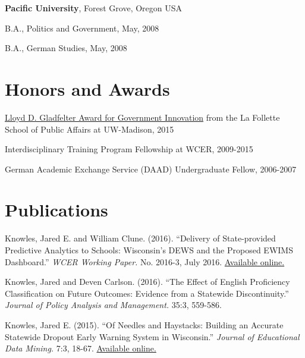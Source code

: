 \documentclass[margin,line]{res}
\newenvironment{list1}{
  \begin{list}{\ding{113}}{%
      \setlength{\itemsep}{0in}
      \setlength{\parsep}{0in} \setlength{\parskip}{0in}
      \setlength{\topsep}{0in} \setlength{\partopsep}{0in} 
      \setlength{\leftmargin}{0.17in}}}{\end{list}}
\begin{document}
\begin{resume}
{\bf Pacific University}, Forest Grove, Oregon USA\\
\vspace*{-.1in}
\begin{list1}
\item[] B.A., Politics and Government,  May, 2008
\item[] B.A., German Studies, May, 2008
\end{list1}


\section{\sc Honors and Awards} 

\href{https://www.lafollette.wisc.edu/news/2015-gladfelter-winners-announced}{Lloyd D. Gladfelter Award for Government Innovation} from the La Follette School of Public Affairs at UW-Madison, 2015

\vspace*{-2.5mm}

Interdisciplinary Training Program Fellowship at WCER, 2009-2015

\vspace*{-2.5mm}

German Academic Exchange Service (DAAD) Undergraduate Fellow, 2006-2007



\section{\sc Publications}

Knowles, Jared E. and William Clune. (2016). ``Delivery of State-provided Predictive
Analytics to Schools: Wisconsin’s DEWS and the Proposed EWIMS Dashboard.'' 
\emph{WCER Working Paper.} No. 2016-3, July 2016. \href{http://wcer-web.ad.education.wisc.edu/docs/working-papers/Working_Paper_No_2016_03.pdf}{Available online.}

Knowles, Jared and Deven Carlson. (2016). ``The Effect of English Proficiency Classification on Future Outcomes: 
Evidence from a Statewide Discontinuity.'' \emph{Journal of Policy Analysis and Management.}
35:3, 559-586. 

Knowles, Jared E. (2015). ``Of Needles and Haystacks: Building an Accurate Statewide 
Dropout Early Warning System in Wisconsin.'' \emph{Journal of Educational Data 
Mining.} 7:3, 18-67. 
\href{http://www.educationaldatamining.org/JEDM/index.php/JEDM/article/view/JEDM082}{Available online.}


\end{resume}
\end{document}
